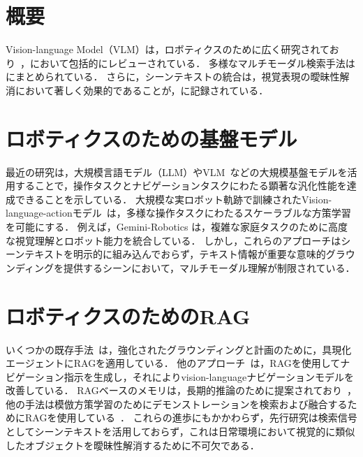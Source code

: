 \section{概要}
Vision-language Model（VLM）は，ロボティクスのために広く研究されており~\cite{brohan2023saycan, brohan2022rt}，\cite{XIAO2025129963, Ma2024ASO}において包括的にレビューされている．
多様なマルチモーダル検索手法は\cite{Cao+ijcal22, wang2024crossmodalretrievalsystematicreview}にまとめられている．
さらに，シーンテキストの統合は，視覚表現の曖昧性解消において著しく効果的であることが，\cite{Long2018SceneTD, Gupta2022}に記録されている．

\section{ロボティクスのための基盤モデル}
最近の研究は，大規模言語モデル（LLM）やVLM~\cite{brohan2023saycan, Driess2023PaLMEAE, brohan2022rt}などの大規模基盤モデルを活用することで，操作タスクとナビゲーションタスクにわたる顕著な汎化性能を達成できることを示している．
大規模な実ロボット軌跡で訓練されたVision-language-actionモデル~\cite{brohan2022rt,Black2025pi05,wen2025dexvla,team2025gemini,li2025controlvla}は，多様な操作タスクにわたるスケーラブルな方策学習を可能にする．
例えば，Gemini-Robotics \cite{team2025gemini}は，複雑な家庭タスクのために高度な視覚理解とロボット能力を統合している．
しかし，これらのアプローチはシーンテキストを明示的に組み込んでおらず，テキスト情報が重要な意味的グラウンディングを提供するシーンにおいて，マルチモーダル理解が制限されている．

\section{ロボティクスのためのRAG}
いくつかの既存手法~\cite{xie2025embodiedrag, zhu2024raea, xu2024prag, monaci2025rana, wang2025rag6dpose}は，強化されたグラウンディングと計画のために，具現化エージェントにRAGを適用している．
他のアプローチ~\cite{wang2025navrag, fan2024bevinstructor}は，RAGを使用してナビゲーション指示を生成し，それによりvision-languageナビゲーションモデルを改善している．
RAGベースのメモリは，長期的推論のために提案されており~\cite{anwar2025remembr}，他の手法は模倣方策学習のためにデモンストレーションを検索および融合するためにRAGを使用している~\cite{kumar2025collage}．
これらの進歩にもかかわらず，先行研究は検索信号としてシーンテキストを活用しておらず，これは日常環境において視覚的に類似したオブジェクトを曖昧性解消するために不可欠である．


